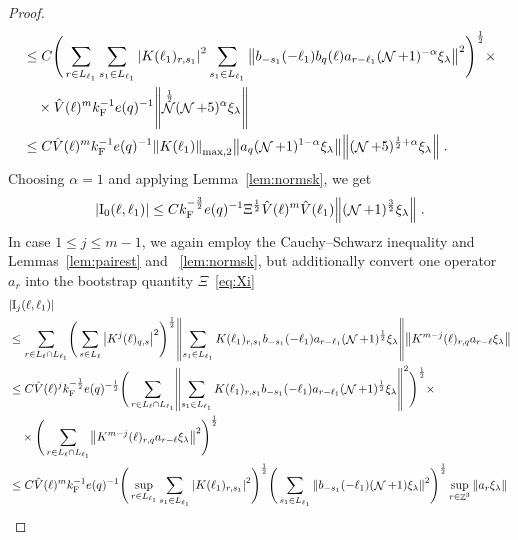 \documentclass[12pt,a4paper]{article}
\numberwithin{equation}{section}
\newcommand{\1}{\mathbb{I}}
\newcommand{\F}{\mathrm{F}}
\newcommand{\I}{\mathrm{I}}
\DeclareMathOperator{\Z}{\mathbb{Z}}
\DeclareMathOperator{\NN}{\mathcal{N}}
\newcommand{\half}{\frac{1}{2}}
\theoremstyle{plain}
\theoremstyle{definition}
\theoremstyle{remark}
\theoremstyle{plain}
\theoremstyle{definition}
\theoremstyle{remark}
\begin{document}
\begin{proof}
\begin{align}
    &\leq C \Bigg( \sum\limits_{r \in L_{\ell_1}}  \sum\limits_{s_1 \in L_{\ell_1}}\abs{K(\ell_1)_{r,s_1}}^2 \sum\limits_{s_1 \in L_{\ell_1}} \norm{ b_{-s_1}(-\ell_1) b_{q}(\ell) a_{r-\ell_1} (\NN+1)^{-\alpha}\xi_\lambda}^2\Bigg)^\half \times\nonumber\\
    & \quad \times \hat{V}(\ell)^m k_{\F}^{-1} e(q)^{-1}  \norm{ \NN^\half(\NN+5)^{\alpha}\xi_\lambda } \nonumber\\
    &\leq C \hat{V}(\ell)^m k_{\F}^{-1} e(q)^{-1}  \norm{K(\ell_1)}_{\mathrm{max,2}}   \norm{   a_{q}(\NN+1)^{1-\alpha}\xi_\lambda} \norm{  (\NN+5)^{\half+\alpha}\xi_\lambda } \nonumber \;.\\
\end{align}
Choosing $\alpha = 1$ and applying Lemma~\ref{lem:normsk}, we get
\begin{equation}
	 |\I_0(\ell, \ell_1)|
	 \leq C k_{\F}^{-\frac{3}{2}} e(q)^{-1} \Xi^\half
	 	\hat{V}(\ell)^m
	 	\hat{V}(\ell_1)
	 	\norm { (\NN+1)^{\frac{3}{2}} \xi_\lambda } \;. \label{eq:estEQ1111} 
\end{equation}
In case $ 1 \le j \le m-1 $, we again employ the Cauchy--Schwarz inequality and Lemmas~\ref{lem:pairest} and ~\ref{lem:normsk}, but additionally convert one operator $ a_r $ into the bootstrap quantity $ \Xi $~\eqref{eq:Xi}
\begin{align}
	&|\I_j(\ell, \ell_1)| \nonumber\\
	&\leq \sum\limits_{r\in L_{\ell} \cap L_{\ell_1}}\! \Bigg( \sum\limits_{s \in L_\ell}\abs{K^{j}(\ell)_{q,s}}^2\Bigg)^\half \norm{ \sum\limits_{ s_1 \in L_{\ell_1}}  K(\ell_1)_{r,s_1} b_{-s_1}(-\ell_1)  a_{r-\ell_1}(\NN+1)^\half\xi_\lambda}
	\norm{  K^{m-j}(\ell)_{r,q} a_{r-\ell} \xi_\lambda } \nonumber\\
	&\leq C \hat{V}(\ell)^j k_{\F}^{-\half} e(q)^{-\half} \Bigg( \sum\limits_{r\in L_{\ell} \cap L_{\ell_1}}\! \norm{ \sum\limits_{ s_1 \in L_{\ell_1}}  K(\ell_1)_{r,s_1} b_{-s_1}(-\ell_1)  a_{r-\ell_1}(\NN+1)^\half\xi_\lambda} ^2\Bigg)^\half \times\nonumber\\
	&\quad \times \Bigg( \sum\limits_{r\in L_{\ell} \cap L_{\ell_1}}\!\norm{  K^{m-j}(\ell)_{r,q} a_{r-\ell} \xi_\lambda }^2\Bigg)^\half \nonumber\\
	&\leq C \hat{V}(\ell)^m k_{\F}^{-1} e(q)^{-1} \Bigg(\sup_{r \in L_{\ell_1}} \sum\limits_{ s_1 \in L_{\ell_1}}\abs{  K(\ell_1)_{r,s_1} }^2\Bigg)^\half
		\Bigg( \sum\limits_{ s_1 \in L_{\ell_1}}\norm{ b_{-s_1}(-\ell_1)  (\NN+1)\xi_\lambda} ^2\Bigg)^\half
	\sup_{r \in \Z^3}\norm{a_r\xi_\lambda} \nonumber\\

\end{align}
\end{proof}
\end{document}
